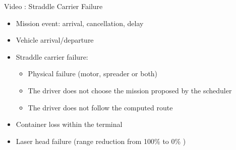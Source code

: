 \documentclass{beamer}
\begin{document}
\begin{frame}{Video : Straddle Carrier Failure}
  \label{Straddle Carrier Failure} 
  \begin{center}
   \end{center}
  
  \begin{center}
    \hyperlink{callSCF}{\beamerreturnbutton{}}
  \end{center}

\end{frame}

  \begin{frame}
    \label{callSCF}
   \begin{itemize}
    \item Mission event: arrival, cancellation, delay
    \item Vehicle arrival/departure
     \item Straddle carrier failure:
	  \begin{itemize}
	      \item  Physical failure (motor, spreader or both) \hyperlink{Straddle Carrier Failure}{}	%
	      \item The driver does not choose the mission proposed by the scheduler
	      \item The driver does not follow the computed route
	  \end{itemize}
    
    \pause
    \item Container loss within the terminal	%
    \pause
    \item Laser head failure (range reduction from 100\% to 0\% ) \hyperlink{Laser Head Failure}{}%
   \end{itemize}
  \end{frame}
  
\end{document}
